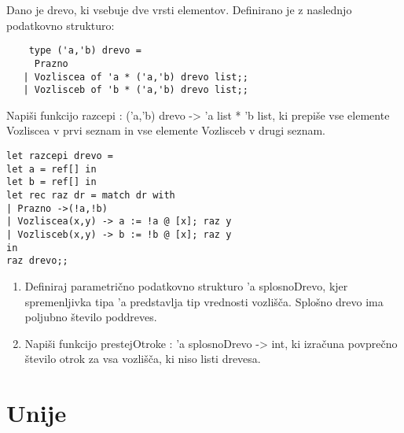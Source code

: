 \begin{ex}
Dano je drevo, ki vsebuje dve vrsti elementov. Definirano je z naslednjo podatkovno strukturo:


\begin{verbatim}
	type ('a,'b) drevo = 
     Prazno 
   | Vozliscea of 'a * ('a,'b) drevo list;;  
   | Vozlisceb of 'b * ('a,'b) drevo list;; 
\end{verbatim}
Napi\v si funkcijo razcepi : ('a,'b) drevo -> 'a list * 'b list, ki prepi\v se vse elemente Vozliscea v prvi seznam in vse elemente Vozlisceb v drugi seznam.

\begin{sol}
\begin{verbatim}
let razcepi drevo =
let a = ref[] in
let b = ref[] in
let rec raz dr = match dr with
| Prazno ->(!a,!b)
| Vozliscea(x,y) -> a := !a @ [x]; raz y
| Vozlisceb(x,y) -> b := !b @ [x]; raz y
in
raz drevo;;
\end{verbatim}
\end{sol}

\end{ex}
\begin{ex}
\begin{enumerate}
    \item Definiraj parametri\v cno podatkovno strukturo 'a splosnoDrevo, kjer spremenljivka tipa 'a predstavlja tip vrednosti vozli\v s\v ca. Splo\v sno drevo ima poljubno \v stevilo poddreves. 
    
    \item Napi\v si funkcijo prestejOtroke : 'a splosnoDrevo -> int, ki izra\v cuna povpre\v cno \v stevilo otrok za vsa vozli\v s\v ca, ki niso listi drevesa.
\end{enumerate}

\end{ex}




\section{Unije}

